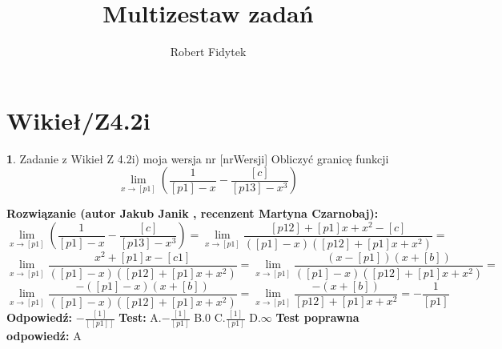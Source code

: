 \documentclass[12pt, a4paper]{article}
\title{Multizestaw zadań}
\author{Robert Fidytek}
\date{}
\theoremstyle{definition} %
\newtheorem{zad}{}
\newcommand{\kategoria}[1]{\section{#1}} %
\newcommand{\zadStart}[1]{\begin{zad}#1\newline} %
\newcommand{\zadStop}{\end{zad}}   %
\newcommand{\rozwStart}[2]{\noindent \textbf{Rozwiązanie (autor #1 , recenzent #2): }\newline} %
\newcommand{\rozwStop}{\newline}                                            %
\newcommand{\odpStart}{\noindent \textbf{Odpowiedź:}\newline}    %
\newcommand{\odpStop}{\newline}                                             %
\newcommand{\testStart}{\noindent \textbf{Test:}\newline} %
\newcommand{\testStop}{\newline} %
\newcommand{\kluczStart}{\noindent \textbf{Test poprawna odpowiedź:}\newline} %
\newcommand{\kluczStop}{\newline} %
\begin{document}
\maketitle


\kategoria{Wikieł/Z4.2i}
\zadStart{Zadanie z Wikieł Z 4.2i) moja wersja nr [nrWersji]}
Obliczyć granicę funkcji $$\lim_{x \to [p1]} (\frac{1}{[p1]-x} - \frac{[c]}{[p13]-x^3})$$
\zadStop
\rozwStart{Jakub Janik}{Martyna Czarnobaj}
$$\lim_{x \to [p1]} (\frac{1}{[p1]-x} - \frac{[c]}{[p13]-x^3})=\lim_{x \to [p1]} \frac{[p12]+[p1]x+x^2-[c]}{([p1]-x)([p12]+[p1]x+x^2)}=$$
$$\lim_{x \to [p1]} \frac{x^2+[p1]x-[c1]}{([p1]-x)([p12]+[p1]x+x^2)}=\lim_{x \to [p1]} \frac{(x-[p1])(x+[b])}{([p1]-x)([p12]+[p1]x+x^2)}=$$
$$\lim_{x \to [p1]} \frac{-([p1]-x)(x+[b])}{([p1]-x)([p12]+[p1]x+x^2)}=\lim_{x \to [p1]} \frac{-(x+[b])}{[p12]+[p1]x+x^2}=-\frac{1}{[p1]}$$
\rozwStop
\odpStart
$-\frac{[1]}{[[p1]]}$
\odpStop
\testStart
A.$-\frac{[1]}{[p1]}$
B.$0$
C.$\frac{[1]}{[p1]}$
D.$\infty$
\testStop
\kluczStart
A
\kluczStop
\end{document}
